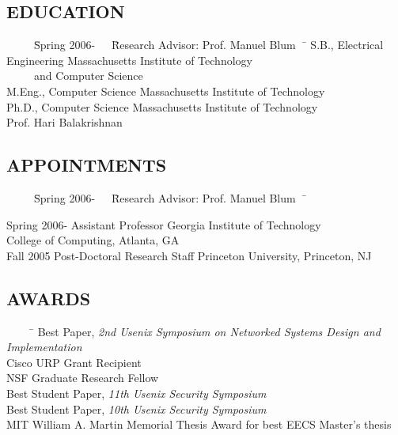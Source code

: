 
\subsection*{EDUCATION}

\begin{tabbing}
\ \ \ \ \ \=Spring 2006-\ \ \ \=Research Advisor: Prof. Manuel Blum\ \ \=   \kill
{}\> S.B., Electrical Engineering \> Massachusetts Institute of
Technology\\ \>\> \ \ \ \ \ and Computer Science \> \\

\> M.Eng., Computer Science \> Massachusetts Institute of Technology\\
\> Ph.D., Computer Science \> Massachusetts Institute of Technology\\
\>  Prof. Hari Balakrishnan \\
\end{tabbing}

\subsection*{APPOINTMENTS}

\begin{tabbing}
\ \ \ \ \ \=Spring 2006-\ \ \ \=Research Advisor: Prof. Manuel Blum\ \ \=   \kill

\> Spring 2006-\> Assistant Professor \> Georgia Institute of Technology \\
\> \> \> College of Computing, Atlanta, GA  \\
\> Fall 2005\> Post-Doctoral Research Staff \> Princeton University,
Princeton, NJ \\
\end{tabbing}

\subsection*{AWARDS}

\begin{tabbing}
\ \ \ \ \ \= \kill
\> Best Paper, {\em 2nd Usenix Symposium on Networked Systems Design
  and Implementation} \\
\> Cisco URP Grant Recipient \\
\> NSF Graduate Research Fellow \\
\> Best Student Paper, {\em 11th Usenix Security Symposium} \\
\> Best Student Paper, {\em 10th Usenix Security Symposium} \\
\> MIT William A. Martin Memorial Thesis Award for best EECS Master's
thesis \\
\end{tabbing}

